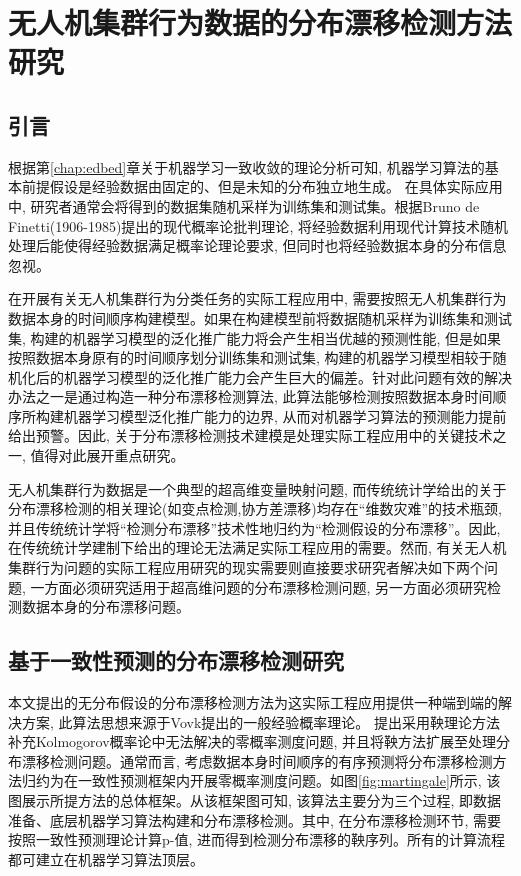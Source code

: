 \chapter{无人机集群行为数据的分布漂移检测方法研究}
\label{chapter:swarm-distributions}

\section{引言}
\label{Introduction}
根据第\ref{chap:edbed}章关于机器学习一致收敛的理论分析可知, 机器学习算法的基本前提假设是经验数据由固定的、但是未知的分布独立地生成\citep{vapnik1995, vapnik1998, Vapnik2006}。 在具体实际应用中, 研究者通常会将得到的数据集随机采样为训练集和测试集。根据Bruno de Finetti(1906-1985)提出的现代概率论批判理论\citep{Finetti1975}, 将经验数据利用现代计算技术随机处理后能使得经验数据满足概率论理论要求, 但同时也将经验数据本身的分布信息忽视\citep{shiryaev2016-1,shiryaev2016-2}。

在开展有关无人机集群行为分类任务的实际工程应用中, 需要按照无人机集群行为数据本身的时间顺序构建模型。如果在构建模型前将数据随机采样为训练集和测试集, 构建的机器学习模型的泛化推广能力将会产生相当优越的预测性能, 但是如果按照数据本身原有的时间顺序划分训练集和测试集, 构建的机器学习模型相较于随机化后的机器学习模型的泛化推广能力会产生巨大的偏差\citep{Shafer2022}。针对此问题有效的解决办法之一是通过构造一种分布漂移检测算法, 此算法能够检测按照数据本身时间顺序所构建机器学习模型泛化推广能力的边界, 从而对机器学习算法的预测能力提前给出预警。因此, 关于分布漂移检测技术建模是处理实际工程应用中的关键技术之一, 值得对此展开重点研究。

无人机集群行为数据是一个典型的超高维变量映射问题, 而传统统计学给出的关于分布漂移检测的相关理论(如变点检测\citep{Wang2021},协方差漂移\citep{Kpotufe2021})均存在“维数灾难”的技术瓶颈\citep{Alexey2013,Shafer2022}, 并且传统统计学将“检测分布漂移”技术性地归约为“检测假设的分布漂移”\citep{Fisher1956,CDenis1990,Malyutov2018}。因此, 在传统统计学建制下给出的理论无法满足实际工程应用的需要。然而, 有关无人机集群行为问题的实际工程应用研究的现实需要则直接要求研究者解决如下两个问题, 一方面必须研究适用于超高维问题的分布漂移检测问题\citep{Vapnik2006}, 另一方面必须研究检测数据本身的分布漂移问题\citep{2003Universal}。


\section{基于一致性预测的分布漂移检测研究}
\label{sec:martingales}
本文提出的无分布假设的分布漂移检测方法为这实际工程应用提供一种端到端的解决方案, 此算法思想来源于Vovk提出的一般经验概率理论\citep{Vovk1993}。 \citet{Vovk1993}提出采用鞅理论方法补充Kolmogorov概率论\citep{Kolmogorov1933,Kolmogorov-en-1956,Kolmogorov-en-1946-leastsquare}中无法解决的零概率测度问题\citep{Shafer2018,Bienvenu2022}, 并且将鞅方法扩展至处理分布漂移检测问题\citep{Vovk2003}。通常而言, 考虑数据本身时间顺序的有序预测将分布漂移检测方法归约为在一致性预测框架内开展零概率测度问题\citep{gammerman1998}。如图\ref{fig:martingale}所示, 该图展示所提方法的总体框架。从该框架图可知, 该算法主要分为三个过程, 即数据准备、底层机器学习算法构建和分布漂移检测。其中, 在分布漂移检测环节, 需要按照一致性预测理论计算p-值, 进而得到检测分布漂移的鞅序列。所有的计算流程都可建立在机器学习算法顶层。

